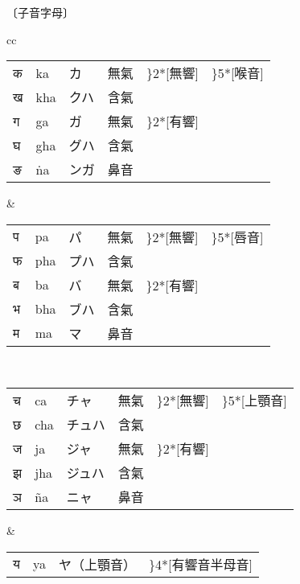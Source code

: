 \begin{center}
〔子音字母〕
\end{center}

\begin{tabular}{cc}
  \begin{minipage}{0.46\hsize}
  \begin{tabular}{llp{}lll}
  {\dnf क} & ka & カ & 無氣 & \rdelim\}{2}{*}[\parbox{1\zw}{無響}] & \rdelim\}{5}{*}[喉音] \\
  {\dnf ख} & kha & クハ & 含氣 & & \\
  {\dnf ग} & ga & ガ & 無氣 & \rdelim\}{2}{*}[\parbox{1\zw}{有響}] & \\
  {\dnf घ} & gha & グハ & 含氣 & & \\
  {\dnf ङ} & ṅa & ンガ & 鼻音 &
  \end{tabular}
  \end{minipage}
  &
  \begin{minipage}{0.46\hsize}
  \begin{tabular}{llllll}
  {\dnf प} & pa & パ & 無氣 & \rdelim\}{2}{*}[\parbox{1\zw}{無響}] & \rdelim\}{5}{*}[\parbox{1\zw}{唇音}] \\
  {\dnf फ} & pha & プハ & 含氣 & & \\
  {\dnf ब} & ba & バ & 無氣 & \rdelim\}{2}{*}[\parbox{1\zw}{有響}] & \\
  {\dnf भ} & bha & ブハ & 含氣 & & \\
  {\dnf म} & ma & マ & 鼻音 &
  \end{tabular}
  \end{minipage}
  \\
  \begin{minipage}{0.46\hsize}
  \begin{tabular}{llp{}lll}
  {\dnf च} & ca & チャ & 無氣 & \rdelim\}{2}{*}[\parbox{1\zw}{無響}] & \rdelim\}{5}{*}[上顎音] \\
  {\dnf छ} & cha & チュハ & 含氣 & & \\
  {\dnf ज} & ja & ジャ & 無氣 & \rdelim\}{2}{*}[\parbox{1\zw}{有響}] & \\
  {\dnf झ} & jha & ジュハ & 含氣 & & \\
  {\dnf ञ} & ña & ニャ & 鼻音 &
  \end{tabular}
  \end{minipage}
  &
  \begin{minipage}{0.46\hsize}
  \begin{tabular}{llll}
  {\dnf य} & ya & ヤ（上顎音） & \rdelim\}{4}{*}[\parbox{3\zw}{有響音半母音}] \\

\end{tabular}
\end{minipage}
\end{tabular}
